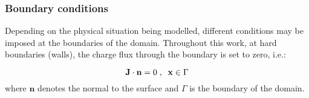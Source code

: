 \subsubsection{Boundary conditions}
Depending on the physical situation being modelled, different
conditions may be imposed at the boundaries of the domain. Throughout
this work, at hard boundaries (walls), the charge flux through the
boundary is set to zero, i.e.:

\begin{equation}\label{eq:et:j0}
\mathbf{J} \cdot \mathbf{n} = 0 \;,\;\; \mathbf{x} \in \Gamma
\end{equation}
where $\mathbf{n}$ denotes the normal to the surface and $\Gamma$ is
the boundary of the domain. 





